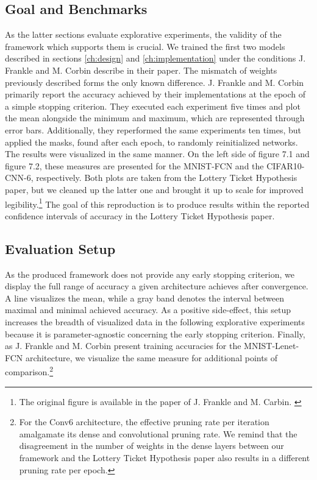 \subsection*{Goal and Benchmarks}
As the latter sections evaluate explorative experiments, the validity of the framework which supports them is crucial. We trained the first two models described in sections \ref{ch:design} and \ref{ch:implementation} under the conditions J. Frankle and M. Corbin describe in their paper. The mismatch of weights previously described forms the only known difference.
J. Frankle and M. Corbin primarily report the accuracy achieved by their implementations at the epoch of a simple stopping criterion. They executed each experiment five times and plot the mean alongside the minimum and maximum, which are represented through error bars. Additionally, they reperformed the same experiments ten times, but applied the masks, found after each epoch, to randomly reinitialized networks. The results were visualized in the same manner. \cite{LTH}
On the left side of figure 7.1 and figure 7.2, these measures are presented for the MNIST-FCN and the CIFAR10-CNN-6, respectively. Both plots are taken from the Lottery Ticket Hypothesis paper, but we cleaned up the latter one and brought it up to scale for improved legibility.\footnote{The original figure is available in the paper of J. Frankle and M. Carbin. \cite{LTH}}  The goal of this reproduction is to produce results within the reported confidence intervals of accuracy in the Lottery Ticket Hypothesis paper.  

\subsection*{Evaluation Setup}
As the produced framework does not provide any early stopping criterion, we display the full range of accuracy a given architecture achieves after convergence. A line visualizes the mean, while a gray band denotes the interval between maximal and minimal achieved accuracy. As a positive side-effect, this setup increases the breadth of visualized data in the following explorative experiments because it is parameter-agnostic concerning the early stopping criterion. Finally,  as J. Frankle and M. Corbin present training accuracies for the MNIST-Lenet-FCN architecture, we visualize the same measure for additional points of comparison.\footnote{
	For the Conv6 architecture, the effective pruning rate per iteration amalgamate its dense and convolutional pruning rate. We remind that the disagreement in the number of weights in the dense layers between our framework and the Lottery Ticket Hypothesis paper also results in a different pruning rate per epoch. 
} 
